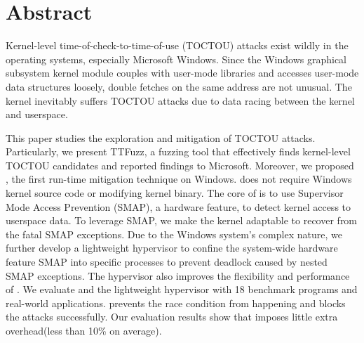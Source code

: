 \section{Abstract}





Kernel-level time-of-check-to-time-of-use (TOCTOU) attacks exist wildly in the operating systems, especially Microsoft Windows. Since the Windows graphical subsystem kernel module couples with user-mode libraries and accesses user-mode data structures loosely, double fetches on the same address are not unusual. The kernel inevitably suffers TOCTOU attacks due to data racing between the kernel and userspace. 

This paper studies the exploration and mitigation of TOCTOU attacks. Particularly, we present TTFuzz, a fuzzing tool that effectively finds kernel-level TOCTOU candidates and reported findings to Microsoft. Moreover, we proposed \name, the first run-time mitigation technique on Windows. \name does not require Windows kernel source code or modifying kernel binary. The core of \name is to use Supervisor Mode Access Prevention (SMAP), a hardware feature, to detect kernel access to userspace data. To leverage SMAP, we make the kernel adaptable to recover from the fatal SMAP exceptions. Due to the Windows system's complex nature, we further develop a lightweight hypervisor to confine the system-wide hardware feature SMAP into specific processes to prevent deadlock caused by nested SMAP exceptions. The hypervisor also improves the flexibility and performance of \name. We evaluate \name and the lightweight hypervisor with 18 benchmark programs and real-world applications. \name prevents the race condition from happening and blocks the attacks successfully. Our evaluation results show that \name imposes little extra overhead(less than 10\% on average).
